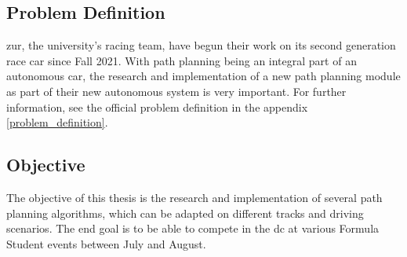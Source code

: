 \subsection{Problem Definition}
\acrlong{zur}, the university's racing team, have begun their work on its second generation race car since Fall 2021. With path planning being an integral part of an autonomous car, the research and implementation of a new path planning module as part of their new autonomous system is very important. For further information, see the official problem definition in the appendix \ref{problem_definition}.

\subsection{Objective}
The objective of this thesis is the research and implementation of several path planning algorithms, which can be adapted on different tracks and driving scenarios. The end goal is to be able to compete in the \acrlong{dc} at various Formula Student events between July and August.

